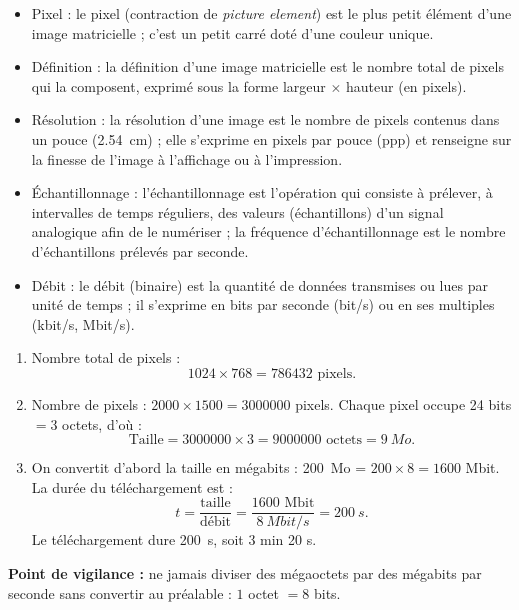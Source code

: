 \documentclass[11pt]{article}
\newcommand{\cle}[1]{{\popxbold\color{popdark}#1}}
\begin{document}
\begin{corrige}
\begin{itemize}
\item \cle{Pixel} : le pixel (contraction de \emph{picture element}) est le plus petit élément d'une image matricielle ; c'est un petit carré doté d'une couleur unique.
\item \cle{Définition} : la définition d'une image matricielle est le nombre total de pixels qui la composent, exprimé sous la forme largeur $\times$ hauteur (en pixels).
\item \cle{Résolution} : la résolution d'une image est le nombre de pixels contenus dans un pouce (\SI{2,54}{cm}) ; elle s'exprime en pixels par pouce (ppp) et renseigne sur la finesse de l'image à l'affichage ou à l'impression.
\item \cle{Échantillonnage} : l'échantillonnage est l'opération qui consiste à prélever, à intervalles de temps réguliers, des valeurs (échantillons) d'un signal analogique afin de le numériser ; la fréquence d'échantillonnage est le nombre d'échantillons prélevés par seconde.
\item \cle{Débit} : le débit (binaire) est la quantité de données transmises ou lues par unité de temps ; il s'exprime en bits par seconde (bit/s) ou en ses multiples (kbit/s, Mbit/s).
\end{itemize}
\end{corrige}

\begin{corrige}
\begin{enumerate}
\item Nombre total de pixels :
\[ 1024 \times 768 = \num{786432} \text{ pixels.} \]
\item Nombre de pixels : $2000 \times 1500 = \num{3000000}$ pixels. Chaque pixel occupe 24 bits $= 3$ octets, d'où :
\[ \text{Taille} = \num{3000000} \times 3 = \num{9000000} \text{ octets} = \SI{9}{Mo}. \]
\item On convertit d'abord la taille en mégabits : \SI{200}{Mo} = $200 \times 8 = \num{1600}$ Mbit. La durée du téléchargement est :
\[ t = \frac{\text{taille}}{\text{débit}} = \frac{\num{1600} \text{ Mbit}}{\SI{8}{Mbit/s}} = \SI{200}{s}. \]
Le téléchargement dure \SI{200}{s}, soit 3 min 20 s.
\end{enumerate}
\textbf{Point de vigilance :} ne jamais diviser des mégaoctets par des mégabits par seconde sans convertir au préalable : $1$ octet $= 8$ bits.
\end{corrige}
\end{document}
